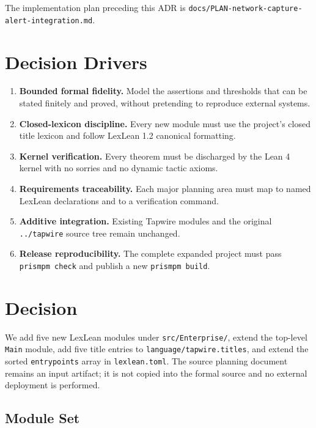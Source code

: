 \documentclass[11pt]{article}
\begin{document}
The implementation plan preceding this ADR is
\texttt{docs/PLAN-network-capture-alert-integration.md}.

\section{Decision Drivers}

\begin{enumerate}
  \item \textbf{Bounded formal fidelity.} Model the assertions and thresholds that can be stated
        finitely and proved, without pretending to reproduce external systems.
  \item \textbf{Closed-lexicon discipline.} Every new module must use the project's closed title
        lexicon and follow LexLean 1.2 canonical formatting.
  \item \textbf{Kernel verification.} Every theorem must be discharged by the Lean 4 kernel with no
        sorries and no dynamic tactic axioms.
  \item \textbf{Requirements traceability.} Each major planning area must map to named LexLean
        declarations and to a verification command.
  \item \textbf{Additive integration.} Existing Tapwire modules and the original
        \texttt{../tapwire} source tree remain unchanged.
  \item \textbf{Release reproducibility.} The complete expanded project must pass \texttt{prismpm
        check} and publish a new \texttt{prismpm build}.
\end{enumerate}

\section{Decision}

We add five new LexLean modules under \texttt{src/Enterprise/}, extend the top-level
\texttt{Main} module, add five title entries to \texttt{language/tapwire.titles}, and extend the
sorted \texttt{entrypoints} array in \texttt{lexlean.toml}. The source planning document remains an
input artifact; it is not copied into the formal source and no external deployment is performed.

\subsection{Module Set}
\end{document}
